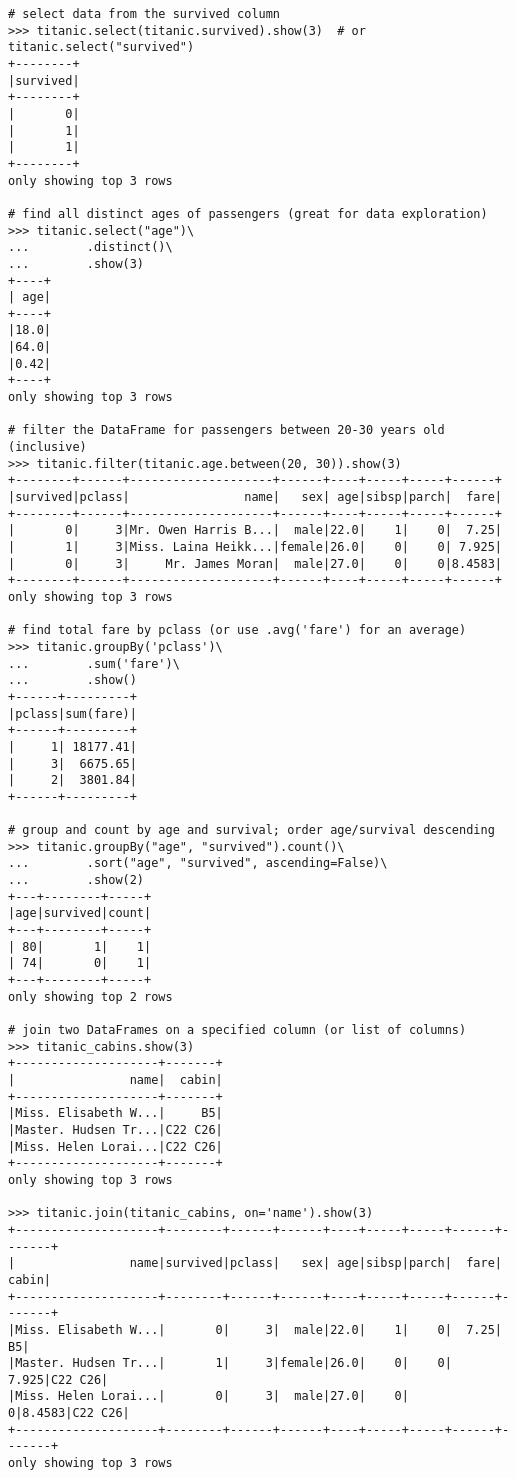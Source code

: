 \begin{lstlisting}
# select data from the survived column
>>> titanic.select(titanic.survived).show(3)  # or titanic.select("survived")
+--------+
|survived|
+--------+
|       0|
|       1|
|       1|
+--------+
only showing top 3 rows

# find all distinct ages of passengers (great for data exploration)
>>> titanic.select("age")\
...        .distinct()\
...        .show(3)
+----+
| age|
+----+
|18.0|
|64.0|
|0.42|
+----+
only showing top 3 rows

# filter the DataFrame for passengers between 20-30 years old (inclusive)
>>> titanic.filter(titanic.age.between(20, 30)).show(3)
+--------+------+--------------------+------+----+-----+-----+------+
|survived|pclass|                name|   sex| age|sibsp|parch|  fare|
+--------+------+--------------------+------+----+-----+-----+------+
|       0|     3|Mr. Owen Harris B...|  male|22.0|    1|    0|  7.25|
|       1|     3|Miss. Laina Heikk...|female|26.0|    0|    0| 7.925|
|       0|     3|     Mr. James Moran|  male|27.0|    0|    0|8.4583|
+--------+------+--------------------+------+----+-----+-----+------+
only showing top 3 rows

# find total fare by pclass (or use .avg('fare') for an average)
>>> titanic.groupBy('pclass')\
...        .sum('fare')\
...        .show()
+------+---------+
|pclass|sum(fare)|
+------+---------+
|     1| 18177.41|
|     3|  6675.65|
|     2|  3801.84|
+------+---------+

# group and count by age and survival; order age/survival descending
>>> titanic.groupBy("age", "survived").count()\ 
...		   .sort("age", "survived", ascending=False)\
...		   .show(2)
+---+--------+-----+
|age|survived|count|
+---+--------+-----+
| 80|       1|    1|
| 74|       0|    1|
+---+--------+-----+
only showing top 2 rows

# join two DataFrames on a specified column (or list of columns)
>>> titanic_cabins.show(3)
+--------------------+-------+
|                name|  cabin|
+--------------------+-------+
|Miss. Elisabeth W...|     B5|
|Master. Hudsen Tr...|C22 C26|
|Miss. Helen Lorai...|C22 C26|
+--------------------+-------+
only showing top 3 rows

>>> titanic.join(titanic_cabins, on='name').show(3)
+--------------------+--------+------+------+----+-----+-----+------+-------+
|                name|survived|pclass|   sex| age|sibsp|parch|  fare|  cabin|
+--------------------+--------+------+------+----+-----+-----+------+-------+
|Miss. Elisabeth W...|       0|     3|  male|22.0|    1|    0|  7.25|     B5|
|Master. Hudsen Tr...|       1|     3|female|26.0|    0|    0| 7.925|C22 C26|
|Miss. Helen Lorai...|       0|     3|  male|27.0|    0|    0|8.4583|C22 C26|
+--------------------+--------+------+------+----+-----+-----+------+-------+
only showing top 3 rows
\end{lstlisting}

